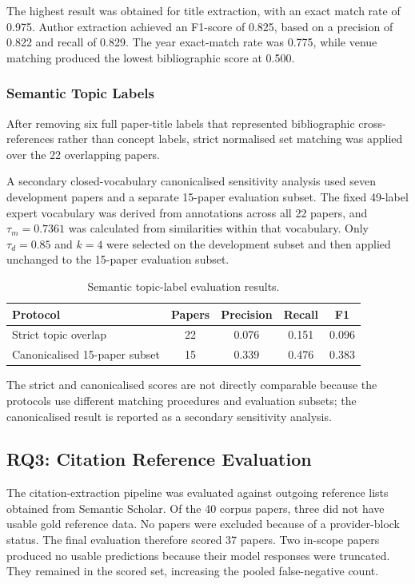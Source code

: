 \documentclass[runningheads]{llncs}
\begin{document}
The highest result was obtained for title extraction, with an exact
match rate of 0.975. Author extraction achieved an F1-score of 0.825,
based on a precision of 0.822 and recall of 0.829. The year exact-match
rate was 0.775, while venue matching produced the lowest bibliographic
score at 0.500.

\subsubsection{Semantic Topic Labels}

After removing six full paper-title labels that represented
bibliographic cross-references rather than concept labels, strict
normalised set matching was applied over the 22 overlapping papers.

A secondary closed-vocabulary canonicalised sensitivity analysis used
seven development papers and a separate 15-paper evaluation subset.
The fixed 49-label expert vocabulary was derived from annotations
across all 22 papers, and \(\tau_m=0.7361\) was calculated from
similarities within that vocabulary. Only \(\tau_d=0.85\) and \(k=4\)
were selected on the development subset and then applied unchanged to
the 15-paper evaluation subset.

\begin{table}[!htbp]
\centering
\caption{Semantic topic-label evaluation results.}
\label{tab:rq2_topic_results}
\begin{tabular}{lcccc}
\toprule
\textbf{Protocol} & \textbf{Papers} & \textbf{Precision} & \textbf{Recall} & \textbf{F1} \\
\midrule
Strict topic overlap & 22 & 0.076 & 0.151 & 0.096 \\
Canonicalised 15-paper subset & 15 & 0.339 & 0.476 & 0.383 \\
\bottomrule
\end{tabular}
\end{table}

The strict and canonicalised scores are not directly comparable because
the protocols use different matching procedures and evaluation subsets;
the canonicalised result is reported as a secondary sensitivity
analysis.

\subsection{RQ3: Citation Reference Evaluation}
\label{sec:rq3_results}

The citation-extraction pipeline was evaluated against outgoing
reference lists obtained from Semantic Scholar. Of the 40 corpus papers, three did not
have usable gold reference data. No papers were excluded because of a
provider-block status. The final evaluation therefore scored 37 papers.
Two in-scope papers produced no usable predictions because their model
responses were truncated. They remained in the scored set, increasing
the pooled false-negative count.
\end{document}
